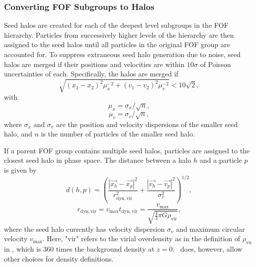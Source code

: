 \subsubsection{Converting FOF Subgroups to Halos}
\label{subsubsec:rockstar--halo_finding--fof_to_halos}


Seed halos are created for each of the deepest level subgroups in the FOF hierarchy.  Particles from successively higher levels of the hierarchy are then assigned to the seed halos until all particles in the original FOF group are accounted for.  To suppress extraneous seed halo generation due to noise, seed halos are merged if their positions and velocities are within $10 \sigma$ of Poisson uncertainties of each.  Specifically, the halos are merged if
\begin{equation}
	\sqrt{(x_{1} - x_{2})^{2} \mu_{x}^{-2} + (v_{1} - v_{2})^{2} \mu_{v}^{-2}} < 10 \sqrt{2},
\end{equation}
with
\begin{equation}
	\mu_{x} = \sigma_{x} / \sqrt{n},
\end{equation}
\begin{equation}
	\mu_{v} = \sigma_{v} / \sqrt{n},
\end{equation}
where $\sigma_{x}$ and $\sigma_{v}$ are the position and velocity dispersions of the smaller seed halo, and $n$ is the number of particles of the smaller seed halo.

If a parent FOF group contains multiple seed halos, particles are assigned to the closest seed halo in phase space.  The distance between a halo $h$ and a particle $p$ is given by
\begin{equation} \label{eq:rockstar--halo_phase_space_distance}
	d(h,p) = \left( \frac{\left| \vec{x_{h}} - \vec{x_{p}} \right|^{2}}{r_{\mathrm{dyn, vir}}^{2}} + \frac{\left| \vec{v_{h}} - \vec{v_{p}} \right|^{2}}{\sigma_{v}^{2}} \right)^{1/2},
\end{equation}
\begin{equation}
	r_{\mathrm{dyn, vir}} = v_{\max} t_{\mathrm{dyn, vir}} = \frac{v_{\max}}{\sqrt{\frac{4}{3} \pi G \rho_{\mathrm{vir}}}},
\end{equation}
where the seed halo currently has velocity dispersion $\sigma_{v}$ and maximum circular velocity $v_{\max}$.  Here, "vir" refers to the virial overdensity as in the definition of $\rho_{\mathrm{vir}}$ in \cn, which is 360 times the background density at $z = 0$.  \rockstar\ does, however, allow other choices for density definitions.



